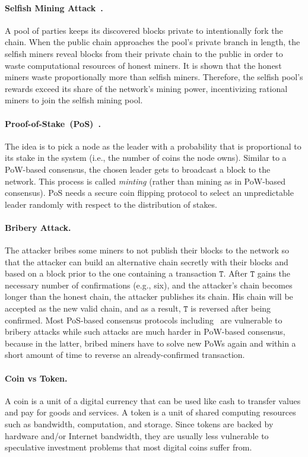 \documentclass[11pt]{article}
\theoremstyle{mytheoremstyle}
\begin{document}
\paragraph{Selfish Mining Attack~\cite{eyal2014}.} A pool of parties keeps its discovered blocks private to intentionally fork the chain. When the public chain approaches the pool's private branch in length, the selfish miners reveal blocks from their private chain to the public in order to waste computational resources of honest miners. It is shown that the honest miners waste proportionally more than selfish miners. Therefore, the selfish pool's rewards exceed its share of the network's mining power, incentivizing rational miners to join the selfish mining pool.

\paragraph{Proof-of-Stake~(PoS)~\cite{cryptoeprint:2016:889}.} The idea is to pick a node as the leader with a probability that is proportional to its stake in the system (i.e., the number of coins the node owns). Similar to a PoW-based consensus, the chosen leader gets to broadcast a block to the network. This process is called \emph{minting} (rather than mining as in PoW-based consensus). PoS needs a secure coin flipping protocol to select an unpredictable leader randomly with respect to the distribution of stakes.

\paragraph{Bribery Attack.} The attacker bribes some miners to not publish their blocks to the network so that the attacker can build an alternative chain secretly with their blocks and based on a block prior to the one containing a transaction $\mathtt{T}$. After $\mathtt{T}$ gains the necessary number of confirmations (e.g., six), and the attacker's chain becomes longer than the honest chain, the attacker publishes its chain. His chain will be accepted as the new valid chain, and as a result, $\mathtt{T}$ is reversed after being confirmed. Most PoS-based consensus protocols including~\cite{cryptoeprint:2016:889,algorand16} are vulnerable to bribery attacks while such attacks are much harder in PoW-based consensus, because in the latter, bribed miners have to solve new PoWs again and within a short amount of time to reverse an already-confirmed transaction.

\paragraph{Coin vs Token.} A coin is a unit of a digital currency that can be used like cash to transfer values and pay for goods and services. A token is a unit of shared computing resources such as bandwidth, computation, and storage. Since tokens are backed by hardware and/or Internet bandwidth, they are usually less vulnerable to speculative investment problems that most digital coins suffer from.
\end{document}

